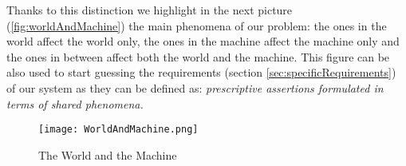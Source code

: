 	Thanks to this distinction we highlight in the next picture (\autoref{fig:worldAndMachine}) the main phenomena of our problem: the ones in the world affect the world only, the ones in the machine affect the machine only and the ones in between affect both the world and the machine. This figure can be also used to start guessing the requirements (section \ref{sec:specificRequirements}) of our system as they can be defined as: \textit{prescriptive assertions formulated in terms of shared phenomena.}
	\vspace{1cm} 
	
	\begin{figure}[h]
		\centering
		\texttt{[image: WorldAndMachine.png]}
		\caption{\label{fig:worldAndMachine}The World and the Machine}
	\end{figure}
 	 